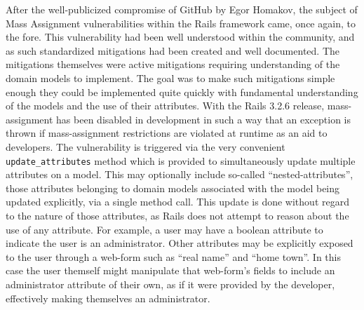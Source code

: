 \documentclass[conference]{IEEEtran}
\begin{document}
After the well-publicized compromise of GitHub by Egor Homakov\cite{egor}, the subject of
Mass Assignment vulnerabilities within the Rails framework came, once again, to the fore.
This vulnerability had been well understood within the community, and as such standardized
mitigations had been created and well documented.  The mitigations themselves were active
mitigations requiring understanding of the domain models to implement.  The goal was to
make such mitigations simple enough they could be implemented quite quickly with
fundamental understanding of the models and the use of their attributes.  With the Rails
3.2.6 release, mass-assignment has been disabled in development in such a way that an exception
is thrown if mass-assignment restrictions are violated at runtime as an aid to developers.
The vulnerability is triggered via the very convenient \texttt{update\_attributes} method
which is provided to simultaneously update multiple attributes on a model.  This may
optionally include so-called ``nested-attributes'', those attributes belonging to domain
models associated with the model being updated explicitly, via a single method call.  This
update is done without regard to the nature of those attributes, as Rails does not attempt
to reason about the use of any attribute.  For example, a user may have a boolean
attribute to indicate the user is an administrator.  Other attributes may be explicitly
exposed to the user through a web-form such as ``real name'' and ``home town''. In this
case the user themself might manipulate that web-form's fields to include an administrator
attribute of their own, as if it were provided by the developer, effectively making
themselves an administrator.
\end{document}
